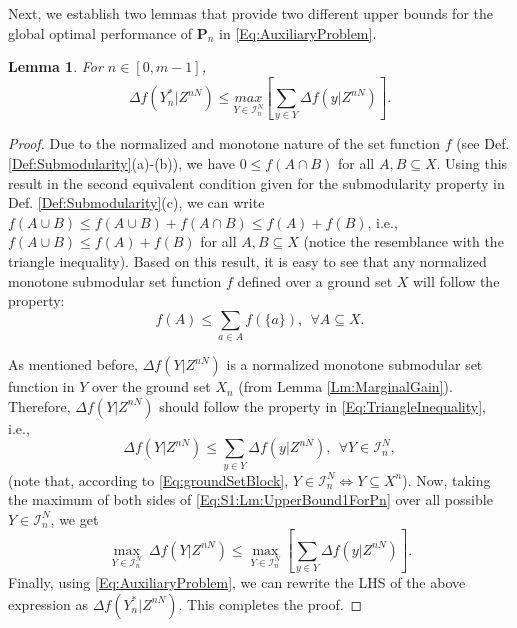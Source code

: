 \documentclass[conference]{IEEEtran}
\newtheorem{lemma}{Lemma}
\begin{document}

Next, we establish two lemmas that provide two different upper bounds for the global optimal performance of $\mathbf{P}_n$ in \eqref{Eq:AuxiliaryProblem}.
\begin{lemma}\label{Lm:UpperBound1ForPn} 
For $n\in[0,m-1]$,
\begin{equation}\label{Eq:Lm:UpperBound1ForPn}
\Delta f(Y^*_n\vert Z^{nN}) \leq  \underset{Y\in\mathcal{I}^N_n}{max} \left[ \sum_{y\in Y} \Delta f(y\vert Z^{nN}) \right].
\end{equation}
\end{lemma}

\begin{proof}
Due to the normalized and monotone nature of the set function $f$ (see Def. \ref{Def:Submodularity}(a)-(b)), we have $0 \leq f(A \cap B)$ for all $A,B \subseteq X$. Using this result in the second equivalent condition given for the submodularity property in Def. \ref{Def:Submodularity}(c), we can write $f(A \cup B) \leq f(A \cup B) + f(A \cap B) \leq f(A) + f(B)$, i.e., $f(A \cup B) \leq f(A) + f(B)$ for all $A,B\subseteq X$ (notice the resemblance with the triangle inequality). Based on this result, it is easy to see that any normalized monotone submodular set function $f$ defined over a ground set $X$ will follow the property: 
\begin{equation}\label{Eq:TriangleInequality}
    f(A)\leq \sum_{a \in A} f(\{a\}), \ \ \forall A \subseteq X.
\end{equation}

As mentioned before, $\Delta f(Y \vert Z^{nN})$ is a normalized monotone submodular set function in $Y$ over the ground set $X_n$ (from Lemma \ref{Lm:MarginalGain}). Therefore, $\Delta f(Y \vert Z^{nN})$ should follow the property in \eqref{Eq:TriangleInequality}, i.e., 
\begin{equation}\label{Eq:S1:Lm:UpperBound1ForPn}
    \Delta f(Y \vert Z^{nN}) \leq \sum_{y \in Y} \Delta f(y\vert Z^{nN}),\ \ \forall Y \in \mathcal{I}^N_n, 
\end{equation}
(note that, according to \eqref{Eq:groundSetBlock}, $Y \in \mathcal{I}^N_n \iff Y \subseteq X^n$). Now, taking the maximum of both sides of \eqref{Eq:S1:Lm:UpperBound1ForPn} over all possible $Y \in \mathcal{I}^N_n$, we get 
\begin{equation}
    \underset{Y\in\mathcal{I}^N_n}{\max}\ \Delta f(Y \vert Z^{nN}) \leq \underset{Y\in\mathcal{I}^N_n}{\max} \left[\sum_{y \in Y} \Delta f(y\vert Z^{nN})\right].
\end{equation}
Finally, using \eqref{Eq:AuxiliaryProblem}, we can rewrite the LHS of the above expression as $\Delta f(Y^*_n\vert Z^{nN})$. This completes the proof. \end{proof}
\end{document}
